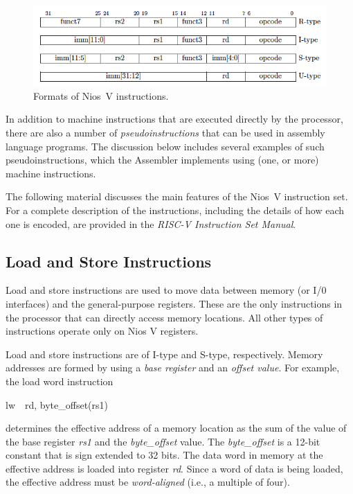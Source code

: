 \documentclass[11pt, twoside, pdftex]{article}
\begin{document}
\begin{figure}[H]
   \begin{center}
      \includegraphics[scale=.55]{figures/insts.png}
   \caption{Formats of Nios~V instructions.} 
	 \label{fig:insts}
	 \end{center}
\end{figure}

In addition to machine instructions that are
executed directly by the processor, there are also a number of {\it pseudoinstructions} that
can be used in assembly language programs.  The discussion below includes several examples 
of such pseudoinstructions, which the Assembler implements using (one, or more) machine 
instructions.

The following material discusses the main features of the Nios~V instruction set.
For a complete description of the instructions, including the details of how each
one is encoded, are provided in the {\it RISC-V Instruction Set Manual}.

\subsection{Load and Store Instructions}

Load and store instructions are used to move data between memory (or I/0 interfaces)
and the general-purpose registers. These are the only instructions in the processor that can
directly access memory locations. All other types of instructions operate only on Nios V
registers. 

Load and store instructions are of I-type and S-type, respectively. Memory addresses are
formed by using a {\it base register} and an {\it offset value}. For example, the load word 
instruction
\vspace{-\baselineskip}
\begin{center}
{\sf lw~~rd, byte\_offset(rs1)}
\end{center}
\noindent
determines the effective address of a memory location as the sum of the value of the base
register {\it rs1} and the {\it byte\_offset} value. The {\it byte\_offset} is a 12-bit 
constant that is sign extended to 32 bits. The data word in memory at the effective address 
is loaded into register {\it rd}. Since a word of data is being loaded, the effective 
address must be {\it word-aligned} (i.e., a multiple of four). 
\end{document}
